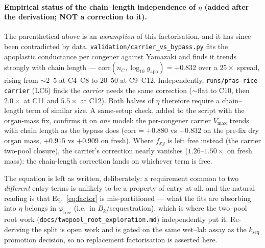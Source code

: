 \documentclass[11pt]{article}
\newcommand{\Bk}{\ensuremath{B_{k}}}
\newcommand{\ffree}{\ensuremath{\varphi_{\mathrm{free}}}}
\begin{document}
\paragraph{Empirical status of the chain--length independence of $\eta$ (added after the
derivation; NOT a correction to it).} The parenthetical above is an \emph{assumption} of this
factorisation, and it has since been contradicted by data. \texttt{validation/carrier\_vs\_bypass.py}
fits the apoplastic conductance per congener against Yamazaki and finds it trends strongly with
chain length --- $\mathrm{corr}(n_C,\log_{10} g_{\mathrm{apo}}) = +0.832$ over a $25\times$ spread,
rising from $\sim2$--$5$ at C4--C8 to $20$--$50$ at C9--C12. Independently,
\texttt{runs/pfas-rice-carrier} (LC6) finds the \emph{carrier} needs the same correction
($\sim$flat to C10, then $2.0\times$ at C11 and $5.5\times$ at C12). Both halves of $\eta$
therefore require a chain--length term of similar size. A same-setup check, added to the script
with the organ-mass fix, confirms it on \emph{one} model: the per-congener carrier $V_{\max}$
trends with chain length as the bypass does ($\mathrm{corr} = +0.880$ vs $+0.832$ on the pre-fix
dry organ mass, $+0.915$ vs $+0.909$ on fresh). Where $f_{xy}$ is left free instead (the carrier
two-pool closure), the carrier's correction nearly vanishes ($1.26$--$1.50\times$ on fresh mass):
the chain-length correction lands on whichever term is free.

The equation is left as written, deliberately: a requirement common to two \emph{different} entry
terms is unlikely to be a property of entry at all, and the natural reading is that
Eq.~\eqref{eq:factor} is mis-partitioned --- what the fits are absorbing into $\eta$ belongs in
$\ffree$ (i.e.\ in $\Bk$/sequestration), which is where the two--pool root work
(\texttt{docs/twopool\_root\_exploration.md}) independently put it. Re-deriving the split is open
work and is gated on the same wet--lab assay as the $k_{\mathrm{seq}}$ promotion decision, so no
replacement factorisation is asserted here.
\end{document}

